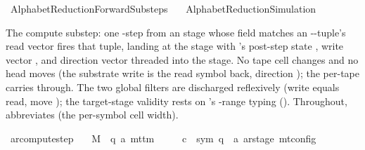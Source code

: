 %
\begin{isabellebody}%
%
%
\isadelimtheory
%
\endisadelimtheory
%
\isatagtheory
{}\isamarkupfalse%
\ AlphabetReduction{\isacharunderscore}{\kern0pt}ForwardSubsteps\isanewline
\ \ \ AlphabetReduction{\isacharunderscore}{\kern0pt}Simulation\isanewline
{}%
\endisatagtheory
{\isafoldtheory}%
%
\isadelimtheory
%
\endisadelimtheory
%
\isadelimdocument
%
\endisadelimdocument
%
\isatagdocument
%
\isamarkuptrue%
%
\endisatagdocument
{\isafolddocument}%
%
\isadelimdocument
%
\endisadelimdocument
%
\begin{isamarkuptext}%
The compute substep: one -step from an
   stage whose  field matches an
  -\isa{{\isasymdelta}}-tuple's read vector fires that tuple,
  landing at the  stage with 's
  post-step state , write vector , and
  direction vector  threaded into the stage.  No tape
  cell changes and no head moves (the substrate write is the read
  symbol back, direction ); the per-tape 
  carries through.  The two global  filters are
  discharged reflexively (write equals read, move ); the
  target-stage validity rests on 's
  \isa{{\isasymdelta}}-range typing ().
  Throughout,  abbreviates  (the per-symbol cell width).%
\end{isamarkuptext}\isamarkuptrue%
\isamarkupfalse%
\ ar{\isacharunderscore}{\kern0pt}compute{\isacharunderscore}{\kern0pt}step{\isacharcolon}{\kern0pt}\isanewline
\ \ \ M\ {\isacharcolon}{\kern0pt}{\isacharcolon}{\kern0pt}\ {\isachardoublequoteopen}{\isacharparenleft}{\kern0pt}{\isacharprime}{\kern0pt}q{\isacharcomma}{\kern0pt}\ {\isacharprime}{\kern0pt}a{\isacharparenright}{\kern0pt}\ mttm{\isachardoublequoteclose}\isanewline
\ \ \ \ \ c{\isacharprime}{\kern0pt}\ {\isacharcolon}{\kern0pt}{\isacharcolon}{\kern0pt}\ {\isachardoublequoteopen}{\isacharparenleft}{\kern0pt}sym{}{\isacharcomma}{\kern0pt}\ {\isacharprime}{\kern0pt}q\ {\isasymtimes}\ {\isacharprime}{\kern0pt}a\ ar{\isacharunderscore}{\kern0pt}stage{\isacharparenright}{\kern0pt}\ mt{\isacharunderscore}{\kern0pt}config{\isachardoublequoteclose}\isanewline

\end{isabellebody}
